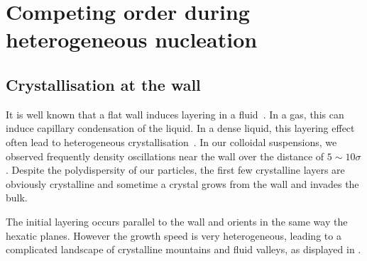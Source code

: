 \chapter{Competing order during heterogeneous nucleation}
\label{ch:crystallisation}

\section{Crystallisation at the wall}

It is well known that a flat wall induces layering in a fluid~\citep{Barrat1999, Mugele2000, Brovchenko2005, Dammer2006}. In a gas, this can induce capillary condensation of the liquid. In a  dense liquid, this layering effect often lead to heterogeneous crystallisation~\citep{Gelb1999, Kegel2001}. In our colloidal suspensions, we observed frequently density oscillations near the wall over the distance of $5\sim10\sigma$. Despite the polydispersity of our particles, the first few crystalline layers are obviously crystalline and sometime a crystal grows from the wall and invades the bulk.

The initial layering occurs parallel to the wall and orients in the same way the hexatic planes. However the growth speed is very heterogeneous, leading to a complicated landscape of crystalline mountains and fluid valleys, as displayed in .


